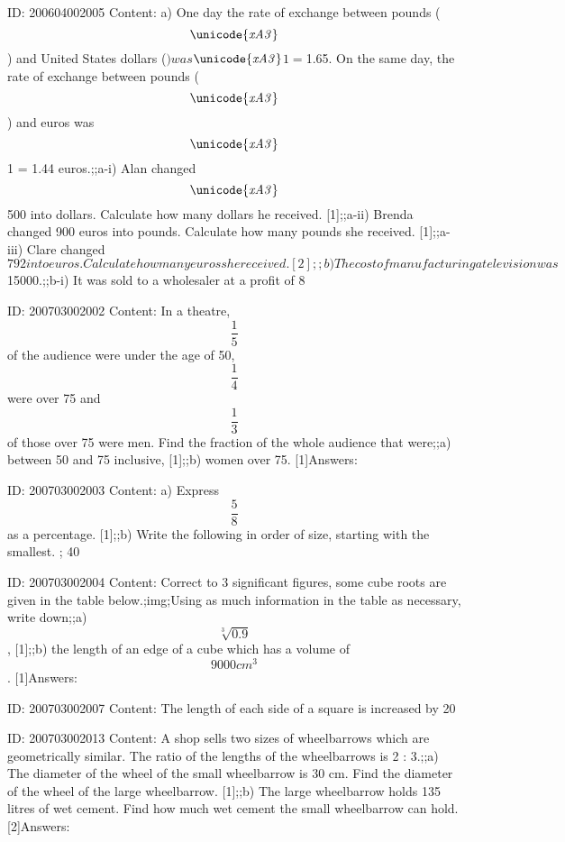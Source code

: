 \documentclass{article}
\begin{document}
ID: 200604002005
Content:
a) One day the rate of exchange between pounds ($$\it\unicode{xA3}$$) and United States dollars ($) was $$\it\unicode{xA3}$$1 = $1.65. On the same day, the rate of exchange between pounds ($$\it\unicode{xA3}$$) and euros was $$\it\unicode{xA3}$$1 = 1.44 euros.;;a-i) Alan changed $$\it\unicode{xA3}$$500 into dollars. Calculate how many dollars he received. [1];;a-ii) Brenda changed 900 euros into pounds. Calculate how many pounds she received. [1];;a-iii) Clare changed $792 into euros. Calculate how many euros she received. [2];;b) The cost of manufacturing a television was $15000.;;b-i) It was sold to a wholesaler at a profit of 8%

ID: 200703002002
Content:
In a theatre, $$\frac{1}{5}$$ of the audience were under the age of 50, $$\frac{1}{4} $$ were over 75 and $$\frac{1}{3}$$ of those over 75 were men. Find the fraction of the whole audience that were;;a) between 50 and 75 inclusive, [1];;b) women over 75. [1]Answers:

ID: 200703002003
Content:
a) Express $$\frac{5}{8}$$ as a percentage. [1];;b) Write the following in order of size, starting with the smallest. ; 40%

ID: 200703002004
Content:
Correct to 3 significant figures, some cube roots are given in the table below.;img;Using as much information in the table as necessary, write down;;a) $$\sqrt[3]{0.9}$$ , [1];;b) the length of an edge of a cube which has a volume of $$9000cm^3$$. [1]Answers:

ID: 200703002007
Content:
The length of each side of a square is increased by 20%

ID: 200703002013
Content:
A shop sells two sizes of wheelbarrows which are geometrically similar. The ratio of the lengths of the wheelbarrows is 2 : 3.;;a) The diameter of the wheel of the small wheelbarrow is 30 cm. Find the diameter of the wheel of the large wheelbarrow. [1];;b) The large wheelbarrow holds 135 litres of wet cement. Find how much wet cement the small wheelbarrow can hold. [2]Answers:
\end{document}
